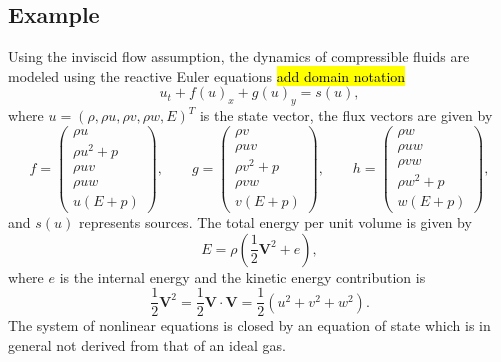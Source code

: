 \documentclass{article}
\begin{document}
    \subsection{Example}
    Using the inviscid flow assumption, the dynamics of compressible fluids are
    modeled using the reactive Euler equations \hl{add domain notation}
    \begin{equation}
       u_{t} + f(u)_{x}
       + g(u)_{y} = s(u),
        \label{goveq}
    \end{equation}
    where $u = \left( \rho, \rho u, \rho v, \rho w, E \right)^{T}$ is
    the state vector, the flux vectors are given by
    \begin{equation}
        f = 
    \begin{pmatrix}
    \rho u \\ \rho u^2 + p \\ \rho u v \\ \rho u w \\ u( E + p )
    \end{pmatrix}, \text{ } \text{ } \text{ }
        g = 
    \begin{pmatrix}
    \rho v \\ \rho u v \\ \rho v^2 + p \\ \rho v w \\ v( E + p )
    \end{pmatrix}, \text{ } \text{ } \text{ }
        h = 
    \begin{pmatrix}
    \rho w \\ \rho u w \\ \rho v w \\ \rho w^2 + p \\ w( E + p )
    \end{pmatrix},
    \end{equation}
    and $s(u)$ represents sources. The total energy per
    unit volume is given by
    \begin{equation*}
        E = \rho \left( \frac{1}{2} \mathbf{V}^{2} + e \right),
    \end{equation*}
    where $e$ is the internal energy and the kinetic energy contribution is
    \begin{equation*}
        \frac{1}{2} \mathbf{V}^{2} = \frac{1}{2} \mathbf{V}
        \cdot \mathbf{V} = \frac{1}{2} \left( u^2 + v^2 + w^2 \right).
    \end{equation*}
    The system of nonlinear equations is closed by an
    equation of state which is in general not derived from that of an ideal gas.
\end{document}
